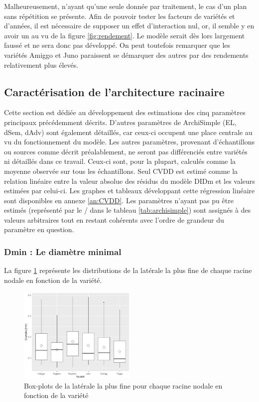 Malheureusement, n'ayant qu'une seule donnée par traitement, le cas d'un plan sans répétition se présente.
Afin de pouvoir tester les facteurs de variétés et d'années, il est nécessaire de supposer un effet d'interaction nul, or, il semble y en avoir un au vu de la figure \ref{fig:rendement}.
Le modèle serait dès lors largement faussé et ne sera donc pas développé.
On peut toutefois remarquer que les variétés Amiggo et Juno paraissent se démarquer des autres par des rendements relativement plus élevés.

\subsection{Caractérisation de l'architecture racinaire}

Cette section est dédiée au développement des estimations des cinq paramètres principaux précédemment décrits.
D'autres paramètres de ArchiSimple (EL, dSem, dAdv) sont également détaillés, car ceux-ci occupent une place centrale au vu du fonctionnement du modèle.
Les autres paramètres, provenant d'échantillons ou sources comme décrit préalablement, ne seront pas différenciés entre variétés ni détaillés dans ce travail.
Ceux-ci sont, pour la plupart, calculés comme la moyenne observée sur tous les échantillons.
Seul CVDD est estimé comme la relation linéaire entre la valeur absolue des résidus du modèle DIDm et les valeurs estimées par celui-ci.
Les graphes et tableaux développant cette régression linéaire sont disponibles en annexe \ref{an:CVDD}.
Les paramètres n'ayant pas pu être estimés (représenté par le / dans le tableau \ref{tab:archisimple}) sont assignés à des valeurs arbitraires tout en restant cohérents avec l'ordre de grandeur du paramètre en question.

\subsubsection{Dmin : Le diamètre minimal}

La figure \ref{fig:boxplot Dmin} représente les distributions de la latérale la plus fine de chaque racine nodale en fonction de la variété.

\begin{figure}[ht]
\centering
\includegraphics[width=0.5\textwidth]{Image/boxplot Dmin.png}
\caption{Box-plots de la latérale la plus fine pour chaque racine nodale en fonction de la variété}
\label{fig:boxplot Dmin}
\end{figure}

